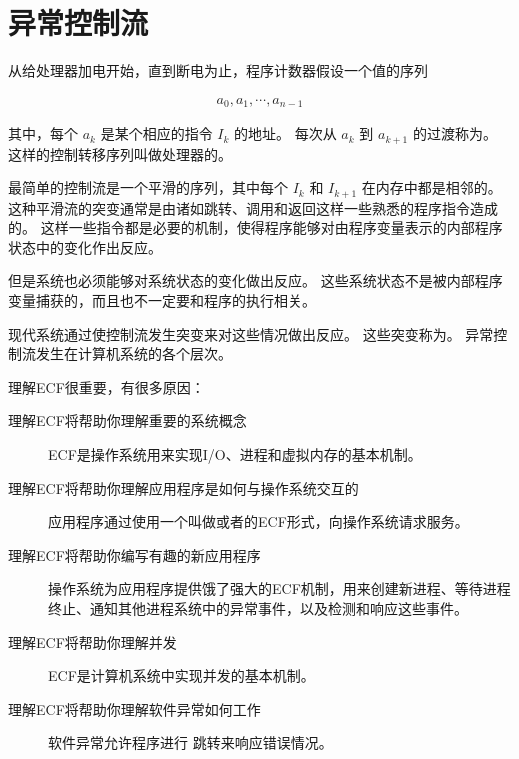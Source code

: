 
\chapter{异常控制流}
{
    从给处理器加电开始，直到断电为止，程序计数器假设一个值的序列

    \begin{align*}
        a_0, a_1, \cdots, a_{n -1}
    \end{align*}

    其中，每个 $a_k$ 是某个相应的指令 $I_k$ 的地址。
    每次从 $a_k$ 到 $a_{k + 1}$ 的过渡称为。
    这样的控制转移序列叫做处理器的。

    最简单的控制流是一个平滑的序列，其中每个 $I_k$ 和 $I_{k + 1}$ 在内存中都是相邻的。
    这种平滑流的突变通常是由诸如跳转、调用和返回这样一些熟悉的程序指令造成的。
    这样一些指令都是必要的机制，使得程序能够对由程序变量表示的内部程序状态中的变化作出反应。

    但是系统也必须能够对系统状态的变化做出反应。
    这些系统状态不是被内部程序变量捕获的，而且也不一定要和程序的执行相关。

    现代系统通过使控制流发生突变来对这些情况做出反应。
    这些突变称为。
    异常控制流发生在计算机系统的各个层次。

    理解ECF很重要，有很多原因：

    \begin{description}
        \item[理解ECF将帮助你理解重要的系统概念] ECF是操作系统用来实现I/O、进程和虚拟内存的基本机制。
        \item[理解ECF将帮助你理解应用程序是如何与操作系统交互的] 应用程序通过使用一个叫做或者的ECF形式，向操作系统请求服务。
        \item[理解ECF将帮助你编写有趣的新应用程序] 操作系统为应用程序提供饿了强大的ECF机制，用来创建新进程、等待进程终止、通知其他进程系统中的异常事件，以及检测和响应这些事件。
        \item[理解ECF将帮助你理解并发] ECF是计算机系统中实现并发的基本机制。
        \item[理解ECF将帮助你理解软件异常如何工作] 软件异常允许程序进行 跳转来响应错误情况。
    \end{description}

    
    
    
    
    
    
    
    
}

\cleardoublepage

\endinput
